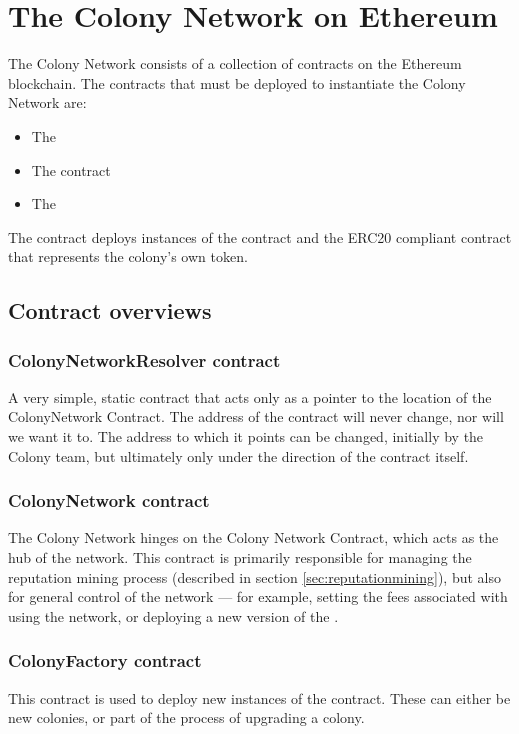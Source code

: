 \section{The Colony Network on Ethereum}\label{sec:colonynetwork}

The Colony Network consists of a collection of contracts on the Ethereum blockchain. The contracts that must be deployed to instantiate the Colony Network are:

\begin{itemize}
\item The 
\item The  contract
\item The 
\end{itemize}

The  contract deploys instances of the  contract and the ERC20 compliant contract that represents the colony's own token.

\subsection{Contract overviews}

\subsubsection{ColonyNetworkResolver contract}
A very simple, static contract that acts only as a pointer to the location of the ColonyNetwork Contract. The address of the  contract will never change, nor will we want it to. The address to which it points can be changed, initially by the Colony team, but ultimately only under the direction of the  contract itself.

\subsubsection {ColonyNetwork contract}

The Colony Network hinges on the Colony Network Contract, which acts as the hub of the network. This contract is primarily responsible for managing the reputation mining process (described in section \ref{sec:reputationmining}), but also for general control of the network --- for example, setting the fees associated with using the network, or deploying a new version of the .

\subsubsection {ColonyFactory contract}
This contract is used to deploy new instances of the  contract. These can either be new colonies, or part of the process of upgrading a colony.

